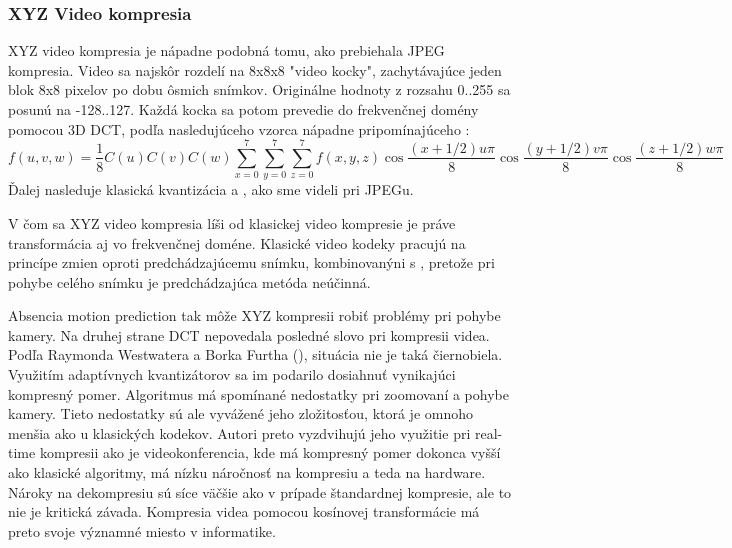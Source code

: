 \subsubsection{XYZ Video kompresia}
XYZ video kompresia je nápadne podobná tomu, ako prebiehala JPEG
kompresia. Video sa najskôr rozdelí na 8x8x8 "video kocky",
zachytávajúce jeden blok 8x8 pixelov po dobu ôsmich snímkov.
Originálne hodnoty z rozsahu 0..255 sa posunú na -128..127.
Každá kocka sa potom prevedie do frekvenčnej domény pomocou 3D DCT,
podľa nasledujúceho vzorca nápadne pripomínajúceho \todo{}:
\begin{equation}
   f(u,v,w) = \frac{1}{8} C(u) C(v) C(w)
    \sum_{x=0}^7 \sum_{y=0}^7 \sum_{z=0}^7 f(x,y,z)
        \cos\frac{(x+1/2) u \pi}{8}
        \cos\frac{(y+1/2) v \pi}{8}
        \cos\frac{(z+1/2) w \pi}{8}
\end{equation}
Ďalej nasleduje klasická kvantizácia a , ako sme
videli pri JPEGu.

V čom sa XYZ video kompresia líši od klasickej video kompresie je
práve transformácia aj vo frekvenčnej doméne. Klasické video kodeky
pracujú na princípe zmien oproti predchádzajúcemu snímku,
kombinovanýni s , pretože pri pohybe celého
snímku je predchádzajúca metóda neúčinná.

Absencia motion prediction tak môže XYZ kompresii robiť problémy pri
pohybe kamery. Na druhej strane DCT nepovedala posledné slovo pri
kompresii videa. Podľa Raymonda Westwatera a Borka Furtha 
(\cite{3ddct_adaptive}), situácia nie je taká
čiernobiela. Využitím adaptívnych kvantizátorov sa im podarilo
dosiahnuť vynikajúci kompresný pomer. Algoritmus má spomínané
nedostatky pri zoomovaní a pohybe kamery. Tieto nedostatky sú ale
vyvážené jeho zložitosťou, ktorá je omnoho menšia ako u klasických
kodekov. Autori preto vyzdvihujú jeho využitie pri real-time kompresii
ako je videokonferencia, kde má kompresný pomer dokonca vyšší ako
klasické algoritmy, má nízku náročnosť na kompresiu a teda na
hardware. Nároky na dekompresiu sú síce väčšie ako v prípade
štandardnej kompresie, ale to nie je kritická závada. Kompresia videa
pomocou kosínovej transformácie má preto svoje významné miesto v
informatike.

